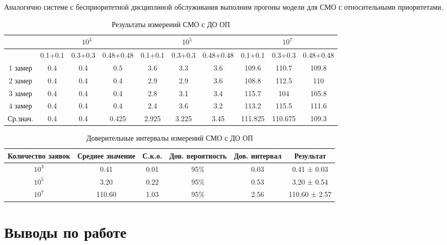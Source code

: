 \documentclass[a4paper,14pt]{report} %
\begin{document}
Аналогично системе с бесприоритетной дисциплиной обслуживания выполним прогоны модели для СМО с относительными приоритетами.
\begin{table}[h]
\caption{Результаты измерений СМО с ДО ОП}
\begin{tabular}{|c|c|c|c|c|c|c|c|c|c|}
\hline
 & \multicolumn{3}{|c|}{$10^3$} & \multicolumn{3}{|c|}{$10^5$} & \multicolumn{3}{|c|}{$10^7$} \\
\hline
 & 0.1+0.1 & 0.3+0.3 & 0.48+0.48 & 0.1+0.1 & 0.3+0.3 & 0.48+0.48 & 0.1+0.1 & 0.3+0.3 & 0.48+0.48 \\
\hline
1 замер & 0.4 & 0.4 & 0.5 &  3.6 & 3.3 & 3.6 & 109.6 & 110.7 & 109.8  \\
\hline
2 замер & 0.4 & 0.4 & 0.4 & 2.9 & 2.9 & 3.6 & 108.8 & 112.5 & 110 \\
\hline
3 замер & 0.4 & 0.4 & 0.4 & 2.8 & 3.1 & 3.4 & 115.7 & 104 & 105.8  \\
\hline
4 замер &  0.4 & 0.4 & 0.4 & 2.4 & 3.6 & 3.2 & 113.2 & 115.5 & 111.6\\
\hline
Ср.знач. &  0.4 & 0.4 & 0.425 & 2.925 & 3.225 & 3.45 & 111.825 & 110.675 & 109.3 \\
\hline
\end{tabular}
\end{table} 

\begin{table}[h]
\caption{Доверительные интервалы измерений СМО с ДО ОП}
\begin{tabular}{|c|c|c|c|c|c|}
\hline
 Количество заявок & Среднее значение & С.к.о. & Дов. вероятность & Дов. интервал & Результат\\
\hline
$10^3$ & 0.41 & 0.01 & 95\% & 0.03 & 0.41 ± 0.03 \\
\hline
$10^5$ & 3.20 & 0.22 & 95\% & 0.53 & 3.20 ± 0.54 \\
\hline
$10^7$ & 110.60 & 1.03 & 95\% &2.56 & 110.60 ± 2.57 \\
\hline
\end{tabular}
\end{table} 

\chapter{Выводы по работе}
\end{document}
